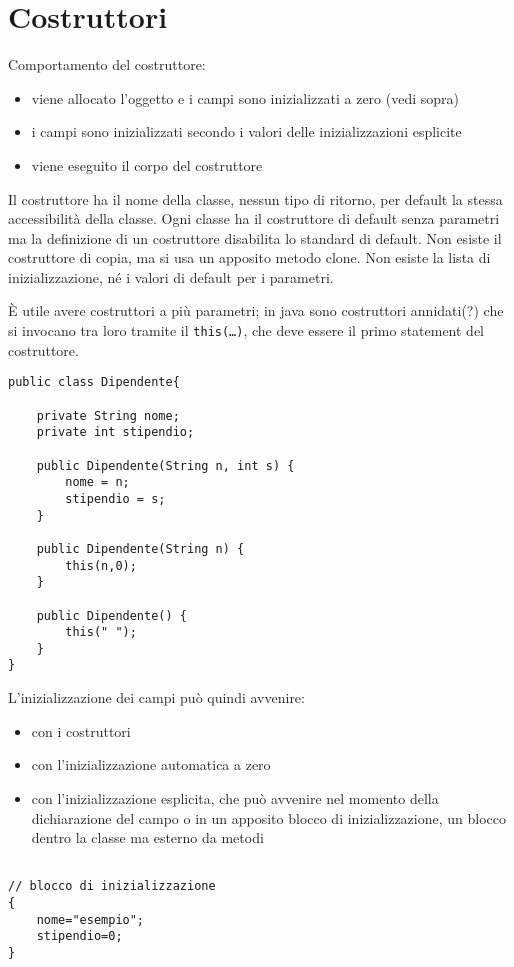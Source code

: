 \section{Costruttori}
Comportamento del costruttore:
\begin{itemize}
\item viene allocato l'oggetto e i campi sono inizializzati a zero (vedi sopra)
\item i campi sono inizializzati secondo i valori delle inizializzazioni esplicite
\item viene eseguito il corpo del costruttore
\end{itemize}


Il costruttore ha il nome della classe, nessun tipo di ritorno, per default la stessa accessibilità della classe.
Ogni classe ha il costruttore di default senza parametri ma la definizione di un costruttore disabilita lo standard di default.
Non esiste il costruttore di copia, ma si usa un apposito metodo clone.
Non esiste la lista di inizializzazione, né i valori di default per i parametri.

È utile avere costruttori a più parametri; in java sono costruttori annidati(?) che si invocano tra loro tramite il \texttt{this(…)}, che deve essere il primo statement del costruttore.

\begin{lstlisting}
public class Dipendente{
    
    private String nome;
    private int stipendio;
    
    public Dipendente(String n, int s) {
        nome = n;
        stipendio = s;
    }

    public Dipendente(String n) {
        this(n,0);
    }

    public Dipendente() {
        this(" ");
    }    
}
\end{lstlisting}

L'inizializzazione dei campi può quindi avvenire:

\begin{itemize}
\item con i costruttori
\item con l'inizializzazione automatica a zero
\item con l'inizializzazione esplicita, che può avvenire nel momento della dichiarazione del campo o in un apposito blocco di inizializzazione, un blocco dentro la classe ma esterno da metodi
\end{itemize}

\begin{verbatim}

// blocco di inizializzazione
{ 
    nome="esempio";
    stipendio=0;
}

\end{verbatim}
 

